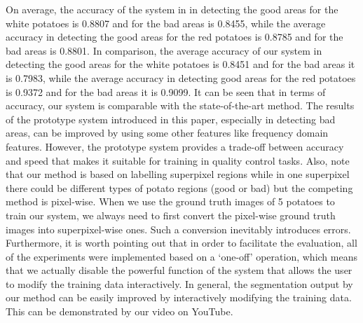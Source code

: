 \documentclass[twocolumn]{svjour3}          %
\begin{document}
On average, the accuracy of the system in \cite{SC11} in detecting the good areas for the white potatoes is 0.8807 and for the bad areas is 0.8455, while the average accuracy in detecting the good areas for the red potatoes is 0.8785 and for the bad areas is 0.8801. In comparison, the average accuracy of our system in detecting the good areas for the white potatoes is 0.8451 and for the bad areas it is 0.7983, while the average accuracy in detecting good areas for the red potatoes is 0.9372 and for the bad areas it is 0.9099. It can be seen that in terms of accuracy, our system is comparable with the state-of-the-art method. The results of the prototype system introduced in this paper, especially in detecting bad areas, can be improved by using some other features like frequency domain features. However, the prototype system provides a trade-off between accuracy and speed that makes it suitable for training in quality control tasks. Also, note that our method is based on labelling superpixel regions while in one superpixel there could be different types of potato regions (good or bad) but the competing method is pixel-wise. When we use the ground truth images of 5 potatoes to train our system, we always need to first convert the pixel-wise ground truth images into superpixel-wise ones. Such a conversion inevitably introduces errors. Furthermore, it is worth pointing out that in order to facilitate the evaluation, all of the experiments were implemented based on a `one-off' operation, which means that we actually disable the powerful function of the system that allows the user to modify the training data interactively. In general, the segmentation output by our method can be easily improved by interactively modifying the training data. This can be demonstrated by our video on YouTube.
\end{document}
